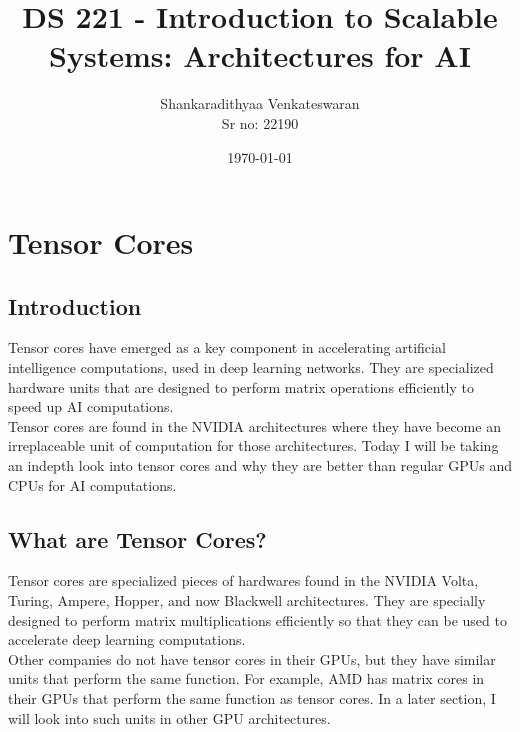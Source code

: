 \documentclass[12pt]{article}
\title{DS 221 - Introduction to Scalable Systems: Architectures for AI}
\author{Shankaradithyaa Venkateswaran\\ Sr no: 22190}
\date{\today}
\begin{document}
    \maketitle

\section{Tensor Cores}
\subsection{Introduction}
Tensor cores have emerged as a key component in accelerating artificial intelligence computations, used in deep learning networks. They are specialized hardware units that are designed to perform matrix operations efficiently to speed up AI computations.\\
Tensor cores are found in the NVIDIA architectures where they have become an irreplaceable unit of computation for those architectures. Today I will be taking an indepth look into tensor cores and why they are better than regular GPUs and CPUs for AI computations.

\subsection{What are Tensor Cores?}
Tensor cores are specialized pieces of hardwares found in the NVIDIA Volta, Turing, Ampere, Hopper, and now Blackwell architectures. They are specially designed to perform matrix multiplications efficiently so that they can be used to accelerate deep learning computations.\\
Other companies do not have tensor cores in their GPUs, but they have similar units that perform the same function. For example, AMD has matrix cores in their GPUs that perform the same function as tensor cores. In a later section, I will look into such units in other GPU architectures.\\
\end{document}
